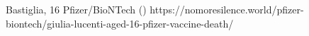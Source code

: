           {Bastiglia, }
          {16}
          {Pfizer/BioNTech}
          {}
          {
             ()
          }
          {https://nomoresilence.world/pfizer-biontech/giulia-lucenti-aged-16-pfizer-vaccine-death/}
